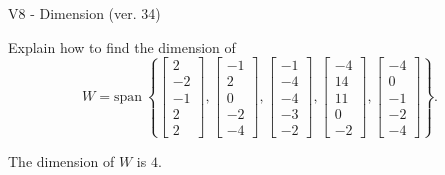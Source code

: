 \begin{exercise}
  \begin{exerciseTitle}V8 - Dimension (ver. 34)\end{exerciseTitle}
  \begin{exerciseStatement}
    Explain how to find the dimension of 
\[W=\mathrm{span}\ \left\{\left[\begin{array}{r}
2 \\
-2 \\
-1 \\
2 \\
2
\end{array}\right] , \left[\begin{array}{r}
-1 \\
2 \\
0 \\
-2 \\
-4
\end{array}\right] , \left[\begin{array}{r}
-1 \\
-4 \\
-4 \\
-3 \\
-2
\end{array}\right] , \left[\begin{array}{r}
-4 \\
14 \\
11 \\
0 \\
-2
\end{array}\right] , \left[\begin{array}{r}
-4 \\
0 \\
-1 \\
-2 \\
-4
\end{array}\right]\right\}.\]



  \end{exerciseStatement}
  \begin{exerciseAnswer}
   The dimension of \(W\) is  \(4\).
  


  \end{exerciseAnswer}
\end{exercise}